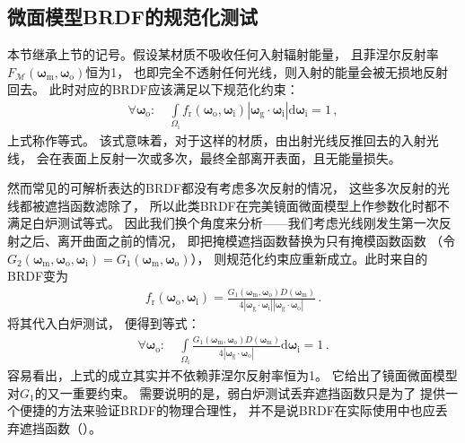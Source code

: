 \subsection{微面模型BRDF的规范化测试}\label{sub:微面模型BRDF的规范化测试}
本节继承上节的记号。假设某材质不吸收任何入射辐射能量，
且菲涅尔反射率$F_{\mathcal{M}}({\bm\omega}_{\mathrm{m}},{\bm\omega}_{\mathrm{o}})$恒为1，
也即完全不透射任何光线，则入射的能量会被无损地反射回去。
此时对应的BRDF应该满足以下规范化约束：
\begin{align}\label{eq:08ex-01-WhiteFurnaceTest}
    \forall {\bm\omega}_{\mathrm{o}}: \quad\int\limits_{{\varOmega}_{\mathrm{i}}}
    f_{\mathrm{r}}({\bm\omega}_{\mathrm{o}},{\bm\omega}_{\mathrm{i}})
    |{\bm\omega}_{\mathrm{g}}\cdot{\bm\omega}_{\mathrm{i}}|\mathrm{d}{\bm\omega}_{\mathrm{i}}=1\, ,
\end{align}
上式称作等式。
该式意味着，对于这样的材质，由出射光线反推回去的入射光线，
会在表面上反射一次或多次，最终全部离开表面，且无能量损失。

然而常见的可解析表达的BRDF都没有考虑多次反射的情况，
这些多次反射的光线都被遮挡函数滤除了，
所以此类BRDF在完美镜面微面模型上作参数化时都不满足白炉测试等式。
因此我们换个角度来分析——我们考虑光线刚发生第一次反射之后、离开曲面之前的情况，
即把掩模遮挡函数替换为只有掩模函数函数
（令$G_2({\bm\omega}_{\mathrm{m}},{\bm\omega}_{\mathrm{o}},{\bm\omega}_{\mathrm{i}})
    =G_1({\bm\omega}_{\mathrm{m}},{\bm\omega}_{\mathrm{o}})$），
则规范化约束应重新成立。此时来自的BRDF变为
\begin{align}
    f_{\mathrm{r}}({\bm\omega}_{\mathrm{o}},{\bm\omega}_{\mathrm{i}})
    =\frac{G_1({\bm\omega}_{\mathrm{m}},{\bm\omega}_{\mathrm{o}})D({\bm\omega}_{\mathrm{m}})}
    {4|{\bm\omega}_{\mathrm{g}}\cdot{\bm\omega}_{\mathrm{i}}||{\bm\omega}_{\mathrm{g}}\cdot{\bm\omega}_{\mathrm{o}}|}\, .
\end{align}
将其代入白炉测试，
便得到等式：
\begin{align}\label{eq:08ex01-WeakWhiteFurnaceTest}
    \forall {\bm\omega}_{\mathrm{o}}: \quad\int\limits_{{\varOmega}_{\mathrm{i}}}
    \frac{G_1({\bm\omega}_{\mathrm{m}},{\bm\omega}_{\mathrm{o}})D({\bm\omega}_{\mathrm{m}})}
    {4|{\bm\omega}_{\mathrm{g}}\cdot{\bm\omega}_{\mathrm{o}}|}\mathrm{d}{\bm\omega}_{\mathrm{i}}=1\, .
\end{align}
容易看出，上式的成立其实并不依赖菲涅尔反射率恒为1。
它给出了镜面微面模型对$G_1$的又一重要约束。
需要说明的是，弱白炉测试丢弃遮挡函数只是为了
提供一个便捷的方法来验证BRDF的物理合理性，
并不是说BRDF在实际使用中也应丢弃遮挡函数（）。

